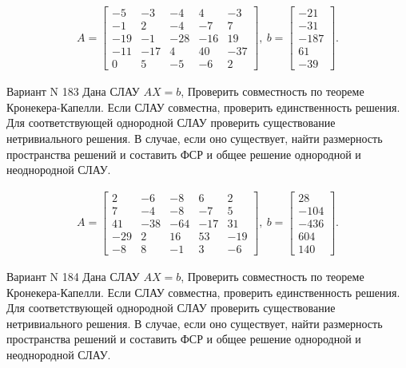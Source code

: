 \documentclass[11pt]{report}
\begin{document}
\begin{align*}
 A = \left[\begin{matrix}-5 & -3 & -4 & 4 & -3\\-1 & 2 & -4 & -7 & 7\\-19 & -1 & -28 & -16 & 19\\-11 & -17 & 4 & 40 & -37\\0 & 5 & -5 & -6 & 2\end{matrix}\right],
\ b = \left[\begin{matrix}-21\\-31\\-187\\61\\-39\end{matrix}\right]. 
 \end{align*}

Вариант N 183
Дана СЛАУ $AX = b$,
Проверить совместность по теореме Кронекера-Капелли. Если СЛАУ совместна, проверить единственность решения.
Для соответствующей однородной СЛАУ проверить существование нетривиального решения. В случае, если оно существует,
найти размерность пространства решений и составить ФСР и общее решение однородной  и неоднородной СЛАУ.


\begin{align*}
 A = \left[\begin{matrix}2 & -6 & -8 & 6 & 2\\7 & -4 & -8 & -7 & 5\\41 & -38 & -64 & -17 & 31\\-29 & 2 & 16 & 53 & -19\\-8 & 8 & -1 & 3 & -6\end{matrix}\right],
\ b = \left[\begin{matrix}28\\-104\\-436\\604\\140\end{matrix}\right]. 
 \end{align*}

Вариант N 184
Дана СЛАУ $AX = b$,
Проверить совместность по теореме Кронекера-Капелли. Если СЛАУ совместна, проверить единственность решения.
Для соответствующей однородной СЛАУ проверить существование нетривиального решения. В случае, если оно существует,
найти размерность пространства решений и составить ФСР и общее решение однородной  и неоднородной СЛАУ.
\end{document}

